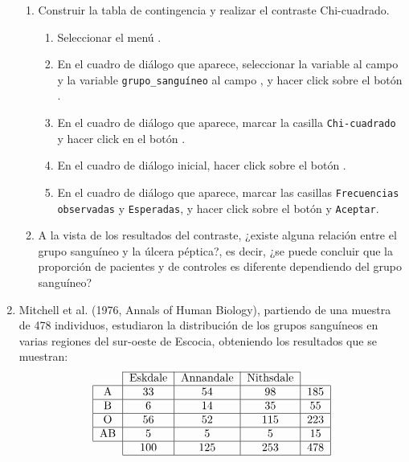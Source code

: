 \begin{enumerate}[leftmargin=*]
\begin{enumerate}
\item Construir la tabla de contingencia y realizar el contraste Chi-cuadrado.
\begin{indicacion}
\begin{enumerate}
\item Seleccionar el menú .
\item En el cuadro de diálogo que aparece, seleccionar la variable  al campo  y la variable \texttt{grupo\_sanguíneo} al campo , y hacer click sobre el botón .
\item En el cuadro de diálogo que aparece, marcar la casilla \texttt{Chi-cuadrado} y hacer click en el botón .
\item En el cuadro de diálogo inicial, hacer click sobre el botón .
\item En el cuadro de diálogo que aparece, marcar las casillas \texttt{Frecuencias observadas} y \texttt{Esperadas}, y hacer click sobre el botón  y \texttt{Aceptar}.
\end{enumerate}
\end{indicacion}

\item A la vista de los resultados del contraste, ¿existe alguna relación entre el grupo sanguíneo y la úlcera
péptica?, es decir, ¿se puede concluir que la proporción de
pacientes y de controles es diferente dependiendo del grupo
sanguíneo?
\end{enumerate}

\item Mitchell et al. (1976, Annals of Human Biology), partiendo
de una muestra de 478 individuos, estudiaron la distribución de
los grupos sanguíneos en varias regiones del sur-oeste de Escocia,
obteniendo los resultados que se muestran:
\[
\begin{tabular}{|l|l|l|l|l|}
\cline{2-4}
\multicolumn{1}{c|}{} & \multicolumn{1}{c|}{Eskdale} & \multicolumn{1}{c|}{Annandale} & \multicolumn{1}{c|}{Nithsdale} & \multicolumn{1}{c}{} \\
\hline
\multicolumn{1}{|c|}{A} & \multicolumn{1}{c|}{33} & \multicolumn{1}{c|}{54} & \multicolumn{1}{c|}{98} & \multicolumn{1}{c|}{185} \\
\hline
\multicolumn{1}{|c|}{B} & \multicolumn{1}{c|}{6} & \multicolumn{1}{c|}{14} & \multicolumn{1}{c|}{35} & \multicolumn{1}{c|}{55} \\
\hline
\multicolumn{1}{|c|}{O} & \multicolumn{1}{c|}{56} & \multicolumn{1}{c|}{52} & \multicolumn{1}{c|}{115} & \multicolumn{1}{c|}{223} \\
\hline
\multicolumn{1}{|c|}{AB} & \multicolumn{1}{c|}{5} & \multicolumn{1}{c|}{5} & \multicolumn{1}{c|}{5} & \multicolumn{1}{c|}{15} \\
\hline
\multicolumn{1}{c|}{} & \multicolumn{1}{c|}{100} & \multicolumn{1}{c|}{125} & \multicolumn{1}{c|}{253} & \multicolumn{1}{c|}{478} \\
\cline{2-5}
\end{tabular}
\]


\end{enumerate}
